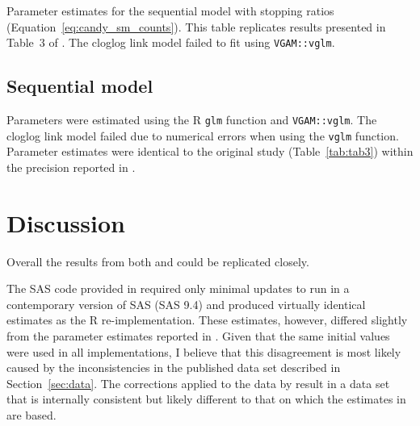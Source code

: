 \begin{table}[htb]
  \small
    \centering
    \caption{Parameter estimates for the sequential model with stopping ratios (Equation~\ref{eq:candy_sm_counts}). 
    This table replicates results presented in Table~3 of \citep{candy1991modeling}. 
    The cloglog link model failed to fit using \texttt{VGAM::vglm}.}
  
  \label{tab:tab3}
\end{table}

\subsection{Sequential model}
Parameters were estimated using the R \verb+glm+ function and \verb+VGAM::vglm+. 
The cloglog link model failed due to numerical errors when using the \verb+vglm+ function. 
Parameter estimates were identical to the original study (Table~\ref{tab:tab3}) within the  precision reported in \citep{candy1991modeling}.



\section{Discussion}
Overall the results from both \citep{dennis1986stochastic} and \citep{candy1991modeling} could be replicated closely.

The SAS code provided in \citep{dennis1986stochastic} required only minimal updates to run in a contemporary version of SAS (SAS 9.4) and produced virtually identical estimates as the R re-implementation. 
These estimates, however, differed slightly from the parameter estimates reported in \citep{kemp1986stochastic}. 
Given that the same initial values were used in all implementations, I believe that this disagreement is most likely caused by the inconsistencies in the published data set described in Section~\ref{sec:data}. 
The corrections applied to the data by \citep{candy1991modeling} result in a data set that is internally consistent but likely different to that on which the estimates in \citep{kemp1986stochastic} are based.  

